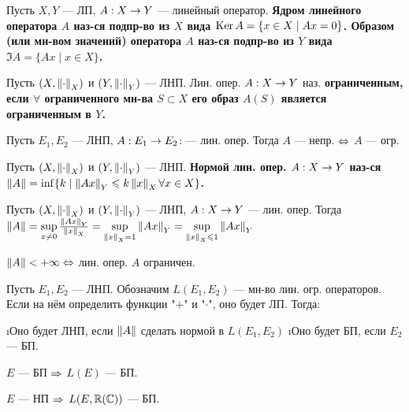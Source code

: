 \begin{defn}
Пусть $X, Y$ --- ЛП, $A: X \rightarrow Y$ --- линейный оператор. \bf{Ядром} линейного оператора $A$ наз-ся подпр-во из $X$ вида $\operatorname{Ker} A = \{x \in X \mid Ax = 0\}$. \bf{Образом} (или \bf{мн-вом значений}) оператора $A$ наз-ся подпр-во из $Y$ вида $\Im A = \{Ax \mid x \in X\}$.
\end{defn}

\begin{defn}
Пусть $(X, \left\lVert\cdot\right\rVert_X)$ и $(Y, \left\lVert\cdot\right\rVert_Y)$ --- ЛНП. Лин. опер. $A: X \rightarrow Y$ наз. \bf{ограниченным}, если $\forall$ ограниченного мн-ва $S \subset X$ его образ $A(S)$ является ограниченным в $Y$. 
\end{defn}

\begin{thm}[5.1]
Пусть $E_1, E_2$ --- ЛНП, $A: E_1 \rightarrow E_2$: --- лин. опер. Тогда $A$ --- непр. $\Leftrightarrow$ $A$ --- огр.
\end{thm}


\begin{defn}
Пусть $(X, \left\lVert\cdot\right\rVert_X)$ и $(Y, \left\lVert\cdot\right\rVert_Y)$ --- ЛНП. \bf{Нормой} лин. опер. $A: X \rightarrow Y$ наз-ся $\left\lVert A\right\rVert = \inf\{k \mid \left\lVert Ax\right\rVert_Y \leqslant k\left\lVert x\right\rVert_X \forall x \in X \}$.
\end{defn}

\begin{stmt}
Пусть $(X, \left\lVert\cdot\right\rVert_X)$ и $(Y, \left\lVert\cdot\right\rVert_Y)$ --- ЛНП, $A: X \rightarrow Y$ --- лин. опер. Тогда 
$\left\lVert A\right\rVert 
= \sup\limits_{x \ne 0} \frac{\left\lVert Ax\right\rVert_Y}{\left\lVert x\right\rVert_X} 
= \sup\limits_{\left\lVert x\right\rVert_X = 1} \left\lVert Ax\right\rVert_Y 
= \sup\limits_{\left\lVert x\right\rVert_X \leqslant 1} \left\lVert Ax\right\rVert_Y$
\end{stmt}

\begin{stmt}
$\left\lVert A\right\rVert < +\infty \Leftrightarrow $ лин. опер. $A$ ограничен.
\end{stmt}

\begin{thm}[5.2]
Пусть $E_1, E_2$ --- ЛНП. Обозначим $L(E_1, E_2)$ --- мн-во лин. огр. операторов. Если на нём определить функции "$+$" и "$\cdot$", оно будет ЛП. Тогда:
\begin{enumerate}
\i Оно будет ЛНП, если $\left\lVert A\right\rVert$ сделать нормой в $L(E_1, E_2)$
\i Оно будет БП, если $E_2$ --- БП.
\end{enumerate}
\end{thm}
\begin{cor}
$E$ --- БП $\Rightarrow$ $L(E)$ --- БП.
\end{cor}
\begin{cor}
$E$ --- НП $\Rightarrow$ $L(E, \mathbb{R}(\mathbb{C}))$ --- БП.
\end{cor}

